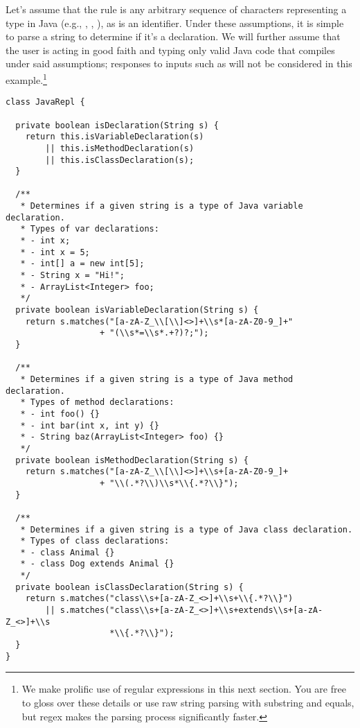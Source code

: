 Let's assume that the  rule is any arbitrary sequence of characters representing a type in Java (e.g., , , ), as is an identifier. 
Under these assumptions, it is simple to parse a string to determine if it's a declaration. 
We will further assume that the user is acting in good faith and typing only valid Java code that compiles under said assumptions; responses to inputs such as  will not be considered in this example.\footnote{We make prolific use of regular expressions in this next section. You are free to gloss over these details or use raw string parsing with substring and equals, but regex makes the parsing process significantly faster.}

\enlargethispage{1\baselineskip}
\begin{lstlisting}[language=MyJava]
class JavaRepl {

  private boolean isDeclaration(String s) {
    return this.isVariableDeclaration(s)
        || this.isMethodDeclaration(s)
        || this.isClassDeclaration(s);
  }

  /**
   * Determines if a given string is a type of Java variable declaration.
   * Types of var declarations:
   * - int x;
   * - int x = 5;
   * - int[] a = new int[5];
   * - String x = "Hi!";
   * - ArrayList<Integer> foo;
   */
  private boolean isVariableDeclaration(String s) {
    return s.matches("[a-zA-Z_\\[\\]<>]+\\s*[a-zA-Z0-9_]+"
                   + "(\\s*=\\s*.+?)?;");
  }

  /**
   * Determines if a given string is a type of Java method declaration.
   * Types of method declarations:
   * - int foo() {}
   * - int bar(int x, int y) {}
   * - String baz(ArrayList<Integer> foo) {}
   */
  private boolean isMethodDeclaration(String s) {
    return s.matches("[a-zA-Z_\\[\\]<>]+\\s+[a-zA-Z0-9_]+
                   + "\\(.*?\\)\\s*\\{.*?\\}");
  }

  /**
   * Determines if a given string is a type of Java class declaration.
   * Types of class declarations:
   * - class Animal {}
   * - class Dog extends Animal {}
   */
  private boolean isClassDeclaration(String s) {
    return s.matches("class\\s+[a-zA-Z_<>]+\\s+\\{.*?\\}") 
        || s.matches("class\\s+[a-zA-Z_<>]+\\s+extends\\s+[a-zA-Z_<>]+\\s
                     *\\{.*?\\}");
  }
}
\end{lstlisting}

